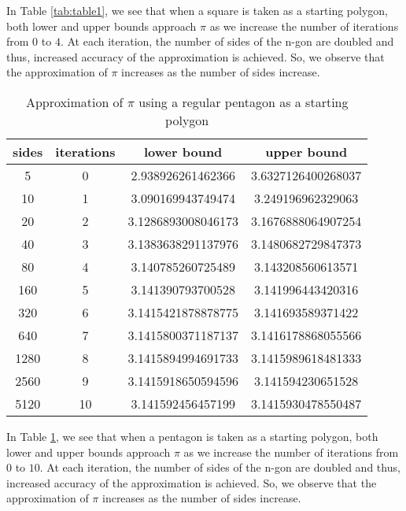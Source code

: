 \documentclass[12pt]{article}
\begin{document}
In Table \ref{tab:table1}, we see that when a square is taken as a starting polygon, both lower and upper bounds approach $\pi$ as we increase the number of iterations from $0$ to $4$. At each iteration, the number of sides of the n-gon are doubled and thus, increased accuracy of the approximation is achieved. So, we observe that the approximation of $\pi$ increases as the number of sides increase.\\
\bigskip
\bigskip
\bigskip
\bigskip
\bigskip
\bigskip


\begin{table}[h!]
  \begin{center}
    \caption{Approximation of $\pi$ using a regular pentagon as a starting polygon}
    \bigskip
    \label{tab:table2}
    \begin{tabular}{c|c|c|c}
      \textbf{sides} & \textbf{iterations} & \textbf{lower bound} & \textbf{upper bound}\\ %
      \hline
      5 & 0 & 2.938926261462366 & 3.6327126400268037\\ %
      10 & 1 & 3.090169943749474 & 3.249196962329063\\ %
      20 & 2 & 3.1286893008046173 & 3.1676888064907254\\ %
      40 & 3 & 3.1383638291137976 & 3.1480682729847373\\ %
      80 & 4 & 3.140785260725489 & 3.143208560613571\\ %
      160 & 5 & 3.141390793700528 & 3.141996443420316\\ %
      320 & 6 & 3.1415421878878775 & 3.141693589371422\\ %
      640 & 7 & 3.1415800371187137 & 3.1416178868055566\\ %
      1280 & 8 & 3.1415894994691733 & 3.1415989618481333\\ %
      2560 & 9 & 3.1415918650594596 & 3.141594230651528\\ %
      5120 & 10 & 3.141592456457199 & 3.1415930478550487\\ %
    \end{tabular}
  \end{center}
\end{table}

In Table \ref{tab:table2}, we see that when a pentagon is taken as a starting polygon, both lower and upper bounds approach $\pi$ as we increase the number of iterations from $0$ to $10$. At each iteration, the number of sides of the n-gon are doubled and thus, increased accuracy of the approximation is achieved. So, we observe that the approximation of $\pi$ increases as the number of sides increase.
\end{document}
